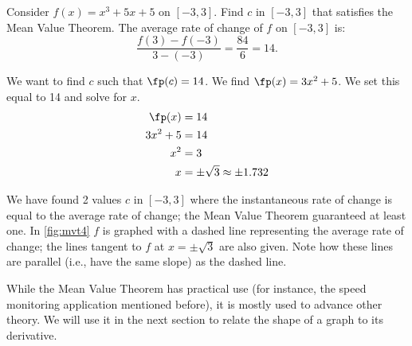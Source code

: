 \begin{example}\label{ex_mvt2}
Consider $f(x) = x^3+5x+5$ on $[-3,3]$. Find $c$ in $[-3,3]$ that satisfies the Mean Value Theorem.
\solution
The average rate of change of $f$ on $[-3,3]$ is:
		\[\frac{f(3)-f(-3)}{3-(-3)} = \frac{84}{6} = 14.\]
		
We want to find $c$ such that $\fp(c) = 14$. We find $\fp(x) = 3x^2+5$. We set this equal to 14 and solve for $x$. 
		\begin{align*}
		\fp(x) &= 14 \\
		3x^2 +5 &= 14\\
		x^2  &= 3\\
		x &= \pm \sqrt{3} \approx \pm 1.732
		\end{align*}
		

We have found 2 values $c$ in $[-3,3]$ where the instantaneous rate of change is equal to the average rate of change; the Mean Value Theorem guaranteed at least one. In \autoref{fig:mvt4} $f$ is graphed with a dashed line representing the average rate of change; the lines tangent to $f$ at $x=\pm \sqrt{3}$ are also given. Note how these lines are parallel (i.e., have the same slope) as the dashed line.
\end{example}

While the Mean Value Theorem has practical use (for instance, the speed monitoring application mentioned before), it is mostly used to advance other theory. We will use it in the next section to relate  the shape of a graph to its derivative.

%

